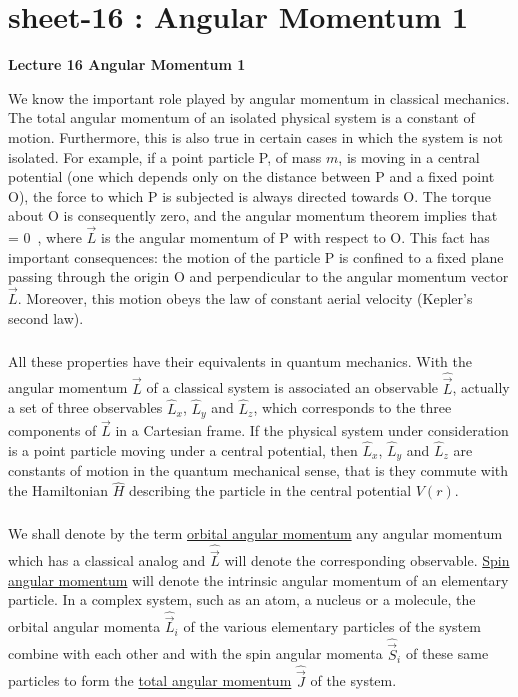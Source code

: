 \chapter{sheet-16 : Angular Momentum 1}


\ifpdf
\graphicspath{{Chapter16/figs/}}
\else
\graphicspath{{Chapter16/figs/}}
\fi


\setcounter{chapter}{16}
\noindent
\begin{Large}
	{\bf Lecture 16 \newline
		Angular Momentum 1}
\end{Large}


\vspace{5 mm}
We know the important role played by angular momentum in classical mechanics. The total angular momentum of an  
isolated physical system is a constant of motion. Furthermore, this is also true in certain cases in which the system
is not isolated. For example, if a point particle P, of mass $m$, is moving in a central potential (one which depends only on 
the distance between P and a fixed point O), the force to which P is subjected is always directed towards O. The torque about O is 
consequently zero, and the angular momentum theorem implies that
\be
{} = 0 \,,
\ee
where $\vec{L}$ is the angular momentum of P with respect to O. This fact has important consequences: the motion of the
particle P is confined to a fixed plane passing through the origin O and perpendicular to the angular momentum
vector $\vec{L}$. Moreover, this motion obeys the law of constant aerial velocity (Kepler's second law).

\paragraph{}
All these properties have their equivalents in quantum mechanics. With the angular momentum $\vec{L}$ of a 
classical system is associated an observable $\hat{\vec{L}}$, actually a set of three observables $\hat{L}_x$,
$\hat{L}_y$ and $\hat{L}_z$, which corresponds to the three components of $\vec{L}$ in a Cartesian frame.  If the
physical system under consideration is a point particle moving under a central potential, then $\hat{L}_x$,
$\hat{L}_y$ and $\hat{L}_z$ are constants of motion in the quantum mechanical sense, that is they commute with
the Hamiltonian $\hat{H}$ describing the particle in the central potential $V(r)$.

\paragraph{}
We shall denote by the term {\underline {orbital angular momentum}} any angular momentum which has a classical analog and
$\hat{\vec{L}}$ will denote the corresponding observable. {\underline{Spin angular momentum}} will denote the
intrinsic angular momentum of an elementary particle. In a complex system, such as an atom, a nucleus or a molecule, the orbital
angular momenta $\hat{\vec{L}}_i$ of the various elementary particles of the system combine with each other and with the 
spin angular momenta $\hat{\vec{S}}_i$ of these same particles to form the {\underline {total angular momentum}}
$\hat{\vec{J}}$ of the system.

